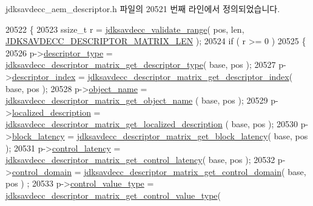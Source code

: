 jdksavdecc\+\_\+aem\+\_\+descriptor.\+h 파일의 20521 번째 라인에서 정의되었습니다.


\begin{DoxyCode}
20522 \{
20523     ssize\_t r = \hyperlink{group__util_ga9c02bdfe76c69163647c3196db7a73a1}{jdksavdecc\_validate\_range}( pos, len, 
      \hyperlink{group__descriptor__matrix_ga28ec282c7b2cb6dc955976b0727a616e}{JDKSAVDECC\_DESCRIPTOR\_MATRIX\_LEN} );
20524     \textcolor{keywordflow}{if} ( r >= 0 )
20525     \{
20526         p->\hyperlink{structjdksavdecc__descriptor__matrix_ab7c32b6c7131c13d4ea3b7ee2f09b78d}{descriptor\_type} = 
      \hyperlink{group__descriptor__matrix_ga9e0b0f1066bd86843f7ee52e91d36a0a}{jdksavdecc\_descriptor\_matrix\_get\_descriptor\_type}( base, pos
       );
20527         p->\hyperlink{structjdksavdecc__descriptor__matrix_a042bbc76d835b82d27c1932431ee38d4}{descriptor\_index} = 
      \hyperlink{group__descriptor__matrix_ga012d85473a12e92c20815589b48e8b8e}{jdksavdecc\_descriptor\_matrix\_get\_descriptor\_index}( base, 
      pos );
20528         p->\hyperlink{structjdksavdecc__descriptor__matrix_a7d1f5945a13863b1762fc6db74fa8f80}{object\_name} = \hyperlink{group__descriptor__matrix_ga93cfa2b3e049a3a3494abb541353f510}{jdksavdecc\_descriptor\_matrix\_get\_object\_name}
      ( base, pos );
20529         p->\hyperlink{structjdksavdecc__descriptor__matrix_a0926f846ca65a83ad5bb06b4aff8f408}{localized\_description} = 
      \hyperlink{group__descriptor__matrix_gae79c65e0a3f1a2209078196924d3a235}{jdksavdecc\_descriptor\_matrix\_get\_localized\_description}
      ( base, pos );
20530         p->\hyperlink{structjdksavdecc__descriptor__matrix_ae2e9f0088d5e900b610d1b2818dfc559}{block\_latency} = 
      \hyperlink{group__descriptor__matrix_ga87ec4e64485477883f4d962511f39fe1}{jdksavdecc\_descriptor\_matrix\_get\_block\_latency}( base, pos );
20531         p->\hyperlink{structjdksavdecc__descriptor__matrix_ab2bd4639caaf9a8078b68368afbd63b6}{control\_latency} = 
      \hyperlink{group__descriptor__matrix_ga1773d6647530cade513b339510015bdf}{jdksavdecc\_descriptor\_matrix\_get\_control\_latency}( base, pos
       );
20532         p->\hyperlink{structjdksavdecc__descriptor__matrix_a8937b22996b7c28ae209f29fe777f03a}{control\_domain} = 
      \hyperlink{group__descriptor__matrix_ga136f95b427f0fd669a6d0637e2eff142}{jdksavdecc\_descriptor\_matrix\_get\_control\_domain}( base, pos )
      ;
20533         p->\hyperlink{structjdksavdecc__descriptor__matrix_a62a5b88a920cc4d09508de6fc60d9a63}{control\_value\_type} = 
      \hyperlink{group__descriptor__matrix_ga646695af74b45e86cf0690416bac3faa}{jdksavdecc\_descriptor\_matrix\_get\_control\_value\_type}( 

\end{DoxyCode}
